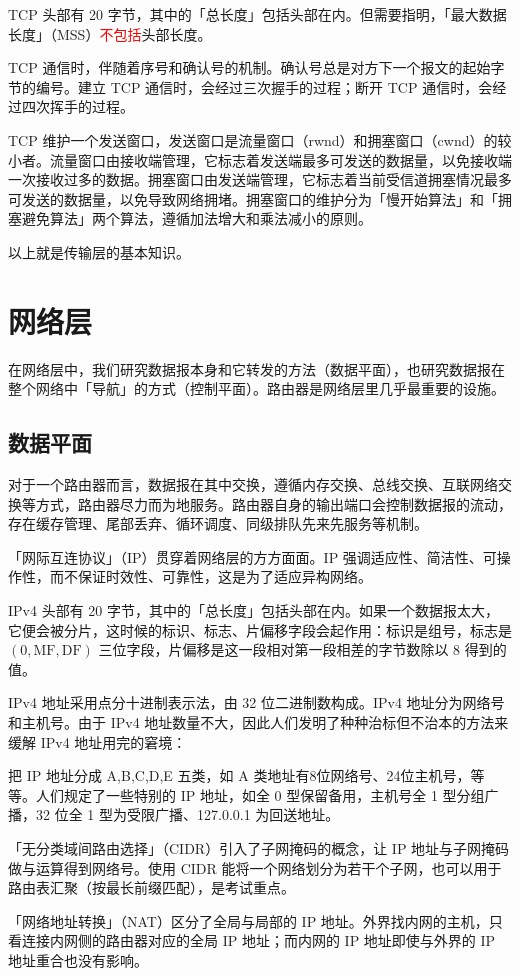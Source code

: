 \documentclass[UTF8]{ctexart}
\newcommand\Concept[1]{\textcolor{cyan!70!black}{#1}}
\begin{document}
TCP 头部有 20 字节，其中的「总长度」包括头部在内。但需要指明，\Concept{「最大数据长度」（MSS）}\textcolor{red}{不包括}头部长度。

TCP 通信时，伴随着序号和确认号的机制。确认号总是对方下一个报文的起始字节的编号。建立 TCP 通信时，会经过三次握手的过程；断开 TCP 通信时，会经过四次挥手的过程。

TCP 维护一个发送窗口，发送窗口是流量窗口（rwnd）和拥塞窗口（cwnd）的较小者。流量窗口由接收端管理，它标志着发送端最多可发送的数据量，以免接收端一次接收过多的数据。拥塞窗口由发送端管理，它标志着当前受信道拥塞情况最多可发送的数据量，以免导致网络拥堵。拥塞窗口的维护分为「慢开始算法」和「拥塞避免算法」两个算法，遵循加法增大和乘法减小的原则。

以上就是传输层的基本知识。

\section{网络层}
在网络层中，我们研究数据报本身和它转发的方法（数据平面），也研究数据报在整个网络中「导航」的方式（控制平面）。路由器是网络层里几乎最重要的设施。

\subsection{数据平面}
对于一个路由器而言，数据报在其中交换，遵循内存交换、总线交换、互联网络交换等方式，路由器尽力而为地服务。路由器自身的输出端口会控制数据报的流动，存在缓存管理、尾部丢弃、循环调度、同级排队先来先服务等机制。

\Concept{「网际互连协议」（IP）}贯穿着网络层的方方面面。IP 强调适应性、简洁性、可操作性，而不保证时效性、可靠性，这是为了适应异构网络。

IPv4 头部有 20 字节，其中的「总长度」包括头部在内。如果一个数据报太大，它便会被分片，这时候的标识、标志、片偏移字段会起作用：标识是组号，标志是 $\mathrm{(0,MF,DF)}$ 三位字段，片偏移是这一段相对第一段相差的字节数除以 8 得到的值。

IPv4 地址采用点分十进制表示法，由 32 位二进制数构成。IPv4 地址分为网络号和主机号。由于 IPv4 地址数量不大，因此人们发明了种种治标但不治本的方法来缓解 IPv4 地址用完的窘境：
\begin{description}[itemsep=0pt,parsep=0pt]
  \item[地址分类] 把 IP 地址分成 A,B,C,D,E 五类，如 A 类地址有8位网络号、24位主机号，等等。人们规定了一些特别的 IP 地址，如全 0 型保留备用，主机号全 1 型分组广播，32 位全 1 型为受限广播、127.0.0.1 为回送地址。
  \item[CIDR] \Concept{「无分类域间路由选择」（CIDR）}引入了子网掩码的概念，让 IP 地址与子网掩码做与运算得到网络号。使用 CIDR 能将一个网络划分为若干个子网，也可以用于路由表汇聚（按最长前缀匹配），是考试重点。
  \item[NAT] \Concept{「网络地址转换」（NAT）}区分了全局与局部的 IP 地址。外界找内网的主机，只看连接内网侧的路由器对应的全局 IP 地址；而内网的 IP 地址即使与外界的 IP 地址重合也没有影响。
\end{description}
\end{document}

